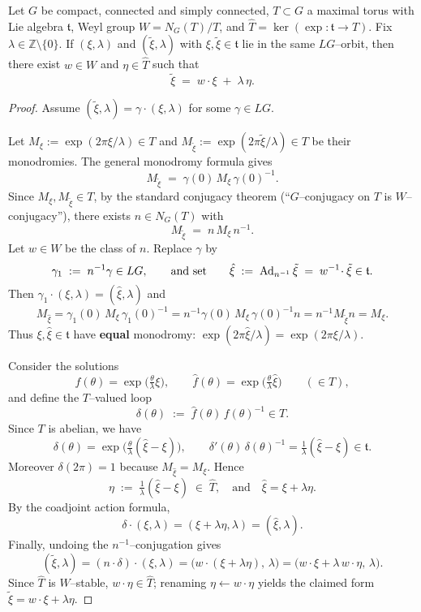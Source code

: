 \documentclass[12pt]{article}
\begin{document}
\begin{lemma}
    Let $G$ be compact, connected and simply connected, $T\subset G$ a maximal
    torus with Lie algebra $\mathfrak t$, Weyl group $W=N_G(T)/T$, and
    $\widehat T=\ker(\exp:\mathfrak t\to T)$. Fix $\lambda\in\mathbb Z\setminus\{0\}$.
    If $(\xi,\lambda)$ and $(\tilde\xi,\lambda)$ with $\xi,\tilde\xi\in\mathfrak t$
    lie in the same $LG$–orbit, then there exist $w\in W$ and $\eta\in\widehat T$
    such that
    \[
        \tilde\xi \;=\; w\!\cdot\xi \;+\; \lambda\,\eta.
    \]
\end{lemma}

\begin{proof}
    Assume $(\tilde\xi,\lambda)=\gamma\cdot(\xi,\lambda)$ for some $\gamma\in LG$.

    Let $M_\xi:=\exp(2\pi\xi/\lambda)\in T$ and $M_{\tilde\xi}:=\exp(2\pi\tilde\xi/\lambda)\in T$
    be their monodromies. The general monodromy formula gives
    \[
        M_{\tilde\xi} \;=\; \gamma(0)\,M_\xi\,\gamma(0)^{-1}.
    \]
    Since $M_\xi,M_{\tilde\xi}\in T$, by the standard conjugacy theorem
    (“$G$–conjugacy on $T$ is $W$–conjugacy”), there exists $n\in N_G(T)$ with
    \[
        M_{\tilde\xi} \;=\; n\,M_\xi\,n^{-1}.
    \]
    Let $w\in W$ be the class of $n$. Replace $\gamma$ by
    \[
        \gamma_1 \;:=\; n^{-1}\gamma \in LG,
        \qquad
        \text{and set}\qquad
        \hat\xi \;:=\; \operatorname{Ad}_{n^{-1}}\tilde\xi \;=\; w^{-1}\!\cdot\tilde\xi \in \mathfrak t.
    \]
    Then $\gamma_1\cdot(\xi,\lambda)=(\hat\xi,\lambda)$ and
    \[
        M_{\hat\xi}
        = \gamma_1(0)\,M_\xi\,\gamma_1(0)^{-1}
        = n^{-1}\gamma(0)\,M_\xi\,\gamma(0)^{-1}n
        = n^{-1}M_{\tilde\xi}n
        = M_\xi.
    \]
    Thus $\xi,\hat\xi\in\mathfrak t$ have \textbf{equal} monodromy:
    $\exp(2\pi\hat\xi/\lambda)=\exp(2\pi\xi/\lambda)$.

    Consider the solutions
    \[
        f(\theta)=\exp\!\Big(\tfrac{\theta}{\lambda}\xi\Big),\qquad
        \hat f(\theta)=\exp\!\Big(\tfrac{\theta}{\lambda}\hat\xi\Big)\qquad(\in T),
    \]
    and define the $T$–valued loop
    \[
        \delta(\theta)\;:=\;\hat f(\theta)\,f(\theta)^{-1}\in T.
    \]
    Since $T$ is abelian, we have
    \[
        \delta(\theta)=\exp\!\Big(\tfrac{\theta}{\lambda}(\hat\xi-\xi)\Big),
        \qquad
        \delta'(\theta)\,\delta(\theta)^{-1}=\tfrac{1}{\lambda}(\hat\xi-\xi)\in\mathfrak t.
    \]
    Moreover $\delta(2\pi)=1$ because $M_{\hat\xi}=M_\xi$. Hence
    \[
        \eta\;:=\;\tfrac{1}{\lambda}(\hat\xi-\xi)\;\in\;\widehat T,
        \quad\text{and}\quad
        \hat\xi=\xi+\lambda\eta.
    \]
    By the coadjoint action formula,
    \[
        \delta\cdot(\xi,\lambda)=(\xi+\lambda\eta,\lambda)=(\hat\xi,\lambda).
    \]
    Finally, undoing the $n^{-1}$–conjugation gives
    \[
        (\tilde\xi,\lambda)
        =(n\cdot\delta)\cdot(\xi,\lambda)
        =\Big(w\!\cdot(\xi+\lambda\eta),\,\lambda\Big)
        =\Big(w\!\cdot\xi+\lambda\,w\!\cdot\eta,\,\lambda\Big).
    \]
    Since $\widehat T$ is $W$–stable, $w\!\cdot\eta\in\widehat T$; renaming
    $\eta\leftarrow w\!\cdot\eta$ yields the claimed form
    $\tilde\xi=w\!\cdot\xi+\lambda\eta$.
\end{proof}
\end{document}
